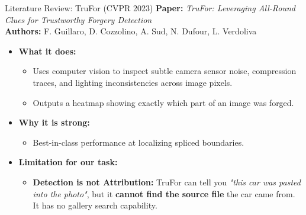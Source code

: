 \documentclass[xcolor=table]{beamer}
\begin{document}
\begin{frame}{Literature Review: TruFor (CVPR 2023)}
  \textbf{Paper:} \textit{TruFor: Leveraging All-Round Clues for Trustworthy Forgery Detection} \\
  \textbf{Authors:} F. Guillaro, D. Cozzolino, A. Sud, N. Dufour, L. Verdoliva
  \vspace{0.2cm}
  \begin{itemize}
    \item \textbf{What it does:} 
    \begin{itemize}
      \item Uses computer vision to inspect subtle camera sensor noise, compression traces, and lighting inconsistencies across image pixels.
      \item Outputs a heatmap showing exactly which part of an image was forged.
    \end{itemize}
    \item \textbf{Why it is strong:} 
    \begin{itemize}
      \item Best-in-class performance at localizing spliced boundaries.
    \end{itemize}
    \item \textbf{Limitation for our task:} 
    \begin{itemize}
      \item \textbf{Detection is not Attribution:} TruFor can tell you \textit{"this car was pasted into the photo"}, but it \textbf{cannot find the source file} the car came from. It has no gallery search capability.
    \end{itemize}
  \end{itemize}
\end{frame}
\end{document}
